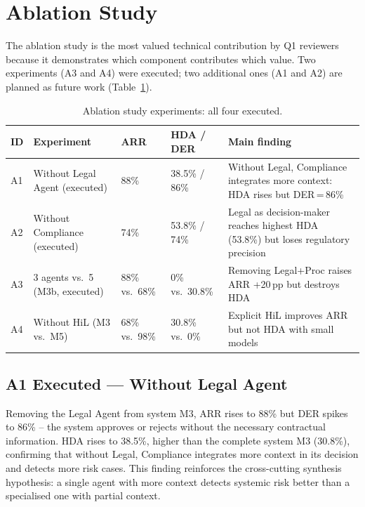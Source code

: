 \documentclass[preprint,12pt,authoryear]{elsarticle}
\begin{document}
\section{Ablation Study}
\label{sec:ablation}

The ablation study is the most valued technical contribution by Q1 reviewers
because it demonstrates which component contributes which value.
Two experiments (A3 and A4) were executed; two additional ones (A1 and A2) are
planned as future work (Table~\ref{tab:ablation}).

\begin{table}[htbp]
\centering
\caption{Ablation study experiments: all four executed.}
\label{tab:ablation}
\begin{tabularx}{\textwidth}{llllX}
\toprule
\textbf{ID} & \textbf{Experiment} & \textbf{ARR} & \textbf{HDA / DER} &
  \textbf{Main finding} \\
\midrule
A1 & Without Legal Agent (executed) & 88\% & 38.5\% / 86\% &
  Without Legal, Compliance integrates more context: HDA rises but DER\,=\,86\% \\
A2 & Without Compliance (executed) & 74\% & 53.8\% / 74\% &
  Legal as decision-maker reaches highest HDA (53.8\%) but loses regulatory precision \\
A3 & 3 agents vs.\ 5 (M3b, executed) & 88\% vs.\ 68\% & 0\% vs.\ 30.8\% &
  Removing Legal+Proc raises ARR +20\,pp but destroys HDA \\
A4 & Without HiL (M3 vs.\ M5) & 68\% vs.\ 98\% & 30.8\% vs.\ 0\% &
  Explicit HiL improves ARR but not HDA with small models \\
\bottomrule
\end{tabularx}
\end{table}

\subsection{A1 Executed --- Without Legal Agent}
\label{sec:a1}

Removing the Legal Agent from system M3, ARR rises to 88\% but DER spikes to
86\% -- the system approves or rejects without the necessary contractual
information.
HDA rises to 38.5\%, higher than the complete system M3 (30.8\%), confirming
that without Legal, Compliance integrates more context in its decision and
detects more risk cases.
This finding reinforces the cross-cutting synthesis hypothesis: a single agent
with more context detects systemic risk better than a specialised one with
partial context.
\end{document}
